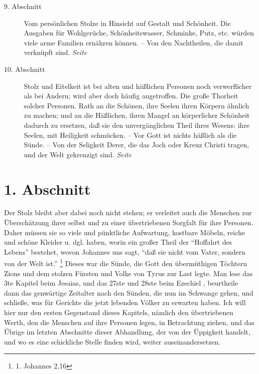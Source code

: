 \begin{description}
\item[9. Abschnitt] Vom persönlichen Stolze in Hinsicht auf Gestalt und
Schönheit. Die Ausgaben für Wohlgerüche, Schönheitswasser, Schminke, Putz, etc.
würden viele arme Familien ernähren können. -- Von den Nachtheilen, die damit
verknüpft sind.
\dotfill \textit{Seite \pageref{kap11_ab9}}\\
\item[10. Abschnitt] Stolz und Eitelkeit ist bei alten und häßlichen Personen
noch verwerflicher als bei Andern; wird aber doch häufig angetroffen. Die große
Thorheit solcher Personen. Rath an die Schönen, ihre Seelen ihren Körpern
ähnlich zu machen; und an die Häßlichen, ihren Mangel an körperlicher Schönheit
dadurch zu ersetzen, daß sie den unvergänglichen Theil ihres Wesens: ihre
Seelen, mit Heiligkeit schmücken. -- Vor Gott ist nichts häßlich als die Sünde.
-- Von der Seligkeit Derer, die das Joch oder Kreuz Christi tragen, und der Welt
gekrenzigt sind.
\dotfill \textit{Seite \pageref{kap11_ab10}}\\

\end{description}

\newpage

\section{1. Abschnitt} \label{kap11_ab1}

Der Stolz bleibt aber dabei noch nicht stehen; er verleitet auch die Menschen
zur Überschätzung ihrer selbst und zu einer übertriebenen Sorgfalt für ihre
Personen. Daher müssen sie so viele und pünktliche Aufwartung, kostbare
Möbeln,
reiche und schöne Kleider u. dgl. haben, worin ein großer Theil
der "`Hoffahrt
des Lebens"' bestehet, wovon Johannes uns sagt,
"`daß sie nicht vom Vater,
sondern von der Welt ist."'
\footnote{1. Johannes 2,16}
Dieses war die Sünde, die Gott
den übermüthigen Töchtern Zions und dem stolzen
Fürsten und Volke von Tyrus zur
Last legte. Man lese das 3te Kapitel beim Jesaias, und das 27ste und 28ste beim
Ezechiel ,
beurtheile dann das genwärtige Zeitalter nach den Sünden, die nun im
Schwange gehen, und schließe, was für Gerichte die jetzt lebenden Völker zu
erwarten haben. Ich will hier nur den ersten Gegenstand dieses Kapitels, nämlich
den übertriebenen Werth, den die Menschen auf ihre Personen legen, in
Betrachtung ziehen, und das Übrige im letzten Abschnitte dieser Abhandlung, der
von der Üppigkeit handelt, und wo es eine schickliche Stelle finden wird,
weiter auseinandersetzen.

